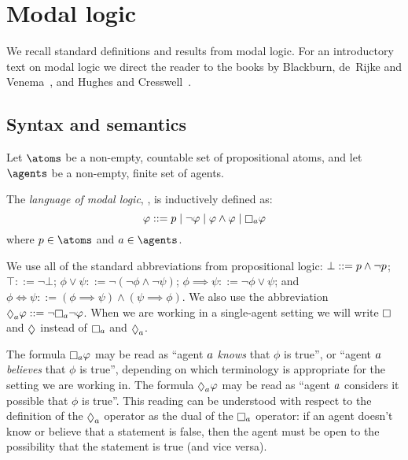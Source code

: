 \section{Modal logic}\label{ml}


We recall standard definitions and results from modal logic.
For an introductory text on modal logic we direct the reader to the books by Blackburn, de~Rijke and Venema~\cite{blackburn:2001}, and Hughes and Cresswell~\cite{hughes:1996}.

\subsection{Syntax and semantics}

Let $\atoms$ be a non-empty, countable set of propositional atoms, and
let $\agents$ be a non-empty, finite set of agents.

\begin{definition}
The {\em language of modal logic}, \langMl{}, is inductively defined as:
$$
\phi ::= 
    \atomP \mid
    \lnot \phi \mid
    \phi \land \phi \mid
    \necessaryA \phi
$$
where $\atomP \in \atoms$ and $\agentA \in \agents$.
\end{definition}

We use all of the standard abbreviations from propositional logic:
$\bot ::= p \land \lnot p$;
$\top ::= \lnot \bot$;
$\phi \lor \psi ::= \lnot (\lnot \phi \land \lnot \psi)$;
$\phi \implies \psi ::= \lnot \phi \lor \psi$; and
$\phi \iff \psi ::= (\phi \implies \psi) \land (\psi \implies \phi)$.
We also use the abbreviation $\possibleA \phi ::= \lnot \necessaryA \lnot \phi$.
When we are working in a single-agent setting we will write $\necessary$ and $\possible$ instead of $\necessaryA$ and $\possibleA$.

The formula $\necessaryA \phi$ may be read as ``agent $a$ {\em knows} that $\phi$ is true'', or ``agent $a$ {\em believes} that $\phi$ is true'', depending on which terminology is appropriate for the setting we are working in.
The formula $\possibleA \phi$ may be read as ``agent $a$ considers it possible that $\phi$ is true''.
This reading can be understood with respect to the definition of the $\possibleA$ operator as the dual of the $\necessaryA$ operator: if an agent doesn't know or believe that a statement is false, then the agent must be open to the possibility that the statement is true (and vice versa).

